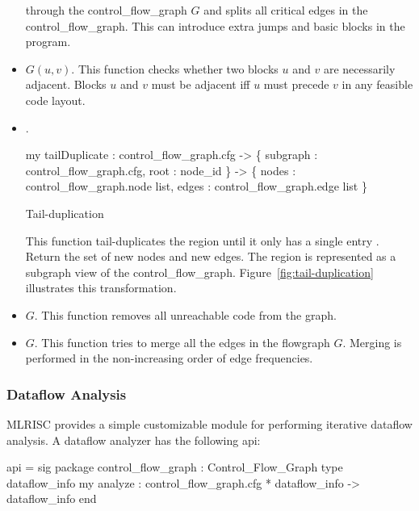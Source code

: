 \begin{itemize}
        through the control_flow_graph $G$ and splits
      all critical edges in the control_flow_graph.
      This can introduce extra jumps and basic blocks in the program.
  \item  {} $G (u,v)$.   This function
      checks whether two blocks $u$ and $v$ are necessarily adjacent.
      Blocks $u$ and $v$ must be adjacent iff $u$ must precede $v$
      in any feasible code layout.
  \item  {}.  
   \begin{SML}
    my tailDuplicate : control_flow_graph.cfg -> \{ subgraph : control_flow_graph.cfg, root : node_id \} 
                                -> \{ nodes : control_flow_graph.node list, 
                                     edges : control_flow_graph.edge list \} 
   \end{SML}
\begin{Figure}
\begin{boxit}
\end{boxit}
\label{fig:tail-duplication} 
\caption{Tail-duplication}
\end{Figure}

      This function tail-duplicates the region 
      until it only has a single entry .
      Return the set of new nodes and new edges.  
      The region is represented as a subgraph view of the control_flow_graph.
      Figure~\ref{fig:tail-duplication} illustrates 
      this transformation.

  \item  {} $G$. This function
          removes all unreachable code  from the graph.
  \item  {} $G$.  This function tries to merge all
         the edges in the flowgraph $G$.  Merging is performed in the
         non-increasing order of edge frequencies. 
\end{itemize}

\subsubsection{Dataflow Analysis}
MLRISC provides a simple customizable module for performing
iterative dataflow analysis.   A dataflow analyzer
has the following api:

\begin{SML}
 api  = sig
   package control_flow_graph : Control_Flow_Graph
   type dataflow_info
   my analyze : control_flow_graph.cfg * dataflow_info -> dataflow_info
 end
\end{SML}

